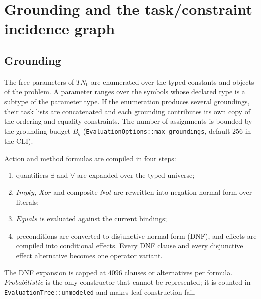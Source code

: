 \documentclass[11pt,a4paper]{article}
\begin{document}
\section{Grounding and the task/constraint incidence graph}

\subsection{Grounding}
The free parameters of $TN_0$ are enumerated over the typed constants and
objects of the problem. A parameter ranges over the symbols whose declared type
is a subtype of the parameter type. If the enumeration produces several
groundings, their task lists are concatenated and each grounding contributes
its own copy of the ordering and equality constraints. The number of
assignments is bounded by the grounding budget $B_g$
(\texttt{EvaluationOptions::max\_groundings}, default $256$ in the CLI).

Action and method formulas are compiled in four steps:
\begin{enumerate}[leftmargin=1.6em,itemsep=1pt]
\item quantifiers $\exists$ and $\forall$ are expanded over the typed universe;
\item $\mathit{Imply}$, $\mathit{Xor}$ and composite $\mathit{Not}$ are
      rewritten into negation normal form over literals;
\item $\mathit{Equals}$ is evaluated against the current bindings;
\item preconditions are converted to disjunctive normal form (DNF), and effects
      are compiled into conditional effects. Every DNF clause and every
      disjunctive effect alternative becomes one operator variant.
\end{enumerate}
The DNF expansion is capped at $4096$ clauses or alternatives per formula.
$\mathit{Probabilistic}$ is the only constructor that cannot be represented;
it is counted in \texttt{EvaluationTree::unmodeled} and makes leaf construction
fail.
\end{document}
